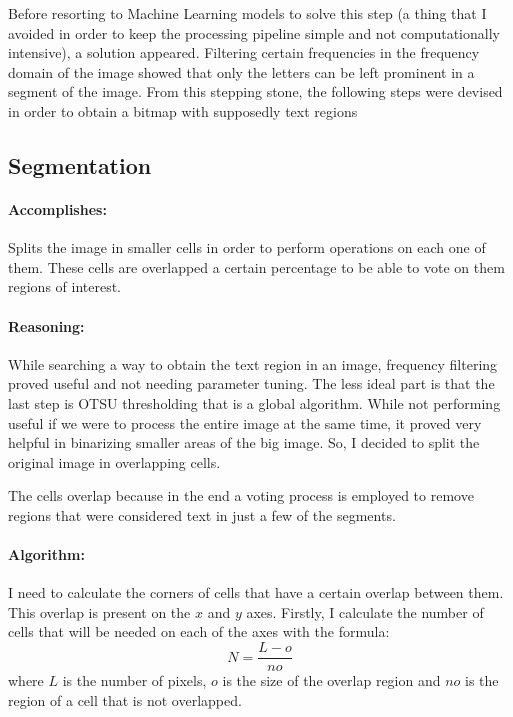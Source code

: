 Before resorting to Machine Learning models to solve this step (a thing that I avoided in order to keep the processing pipeline simple and not computationally intensive), a solution appeared. Filtering certain frequencies in the frequency domain of the image showed that only the letters can be left prominent in a segment of the image. From this stepping stone, the following steps were devised in order to obtain a bitmap with supposedly text regions

\subsection{Segmentation}

\paragraph*{Accomplishes:}\mbox{}\par
Splits the image in smaller cells in order to perform operations on each one of them. These cells are overlapped a certain percentage to be able to vote on them regions of interest.

\paragraph*{Reasoning:}\mbox{}\par
While searching a way to obtain the text region in an image, frequency filtering proved useful and not needing parameter tuning. The less ideal part is that the last step is OTSU thresholding that is a global algorithm. While not performing useful if we were to process the entire image at the same time, it proved very helpful in binarizing smaller areas of the big image. So, I decided to split the original image in overlapping cells.

The cells overlap because in the end a voting process is employed to remove regions that were considered text in just a few of the segments.

\paragraph*{Algorithm:}\mbox{}\par
I need to calculate the corners of cells that have a certain overlap between them. This overlap is present on the $x$ and $y$ axes. Firstly, I calculate the number of cells that will be needed on each of the axes with the formula:
\[N = \frac{L - o}{no}\]
where $L$ is the number of pixels, $o$ is the size of the overlap region and $no$ is the region of a cell that is not overlapped.

